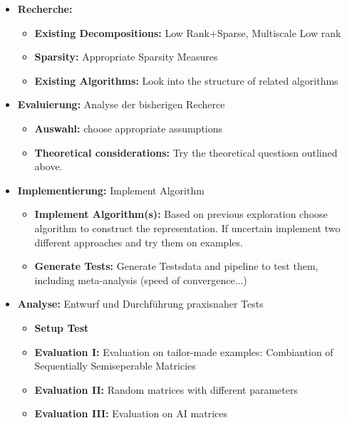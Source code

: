 \documentclass[lang=ngerman,inputenc=utf8,fontsize=10pt]{ldvarticle}
\begin{document}
\begin{itemize}
	\item \textbf{Recherche:}
	\begin{itemize}
			\item \textbf{Existing Decompositions:} Low Rank+Sparse, Multiscale Low rank \cite{chandrasekaran_sparse_2009,ong_beyond_2016,yu_compressing_2017}
			\item \textbf{Sparsity:} Appropriate Sparsity Measures \cite{ulfarsson_sparse_2015,parekh_improved_2017}
			\item \textbf{Existing Algorithms:} Look into the structure of related algorithms
		\end{itemize}
	\item \textbf{Evaluierung:} Analyse der bisherigen Recherce
		\begin{itemize}
			\item \textbf{Auswahl:} choose appropriate assumptions
			\item \textbf{Theoretical considerations:} Try the theoretical questiosn outlined above.
		\end{itemize}
	\item \textbf{Implementierung:} Implement Algorithm
		\begin{itemize}
			\item \textbf{Implement Algorithm(s):} Based on previous exploration choose algorithm to construct the representation. If uncertain implement two different approaches and try them on examples.
			\item \textbf{Generate Tests:} Generate Testsdata and pipeline to test them, including meta-analysis (speed of convergence...)
		\end{itemize}
	\item \textbf{Analyse:} Entwurf und Durchführung praxisnaher Tests
		\begin{itemize}
			\item \textbf{Setup Test}
			\item \textbf{Evaluation I:} Evaluation on tailor-made examples: Combiantion of Sequentially Semiseperable Matricies %
			\item \textbf{Evaluation II:} Random matrices with different parameters
			\item \textbf{Evaluation III:} Evaluation on AI matrices
		\end{itemize}

\end{itemize}
\end{document}
